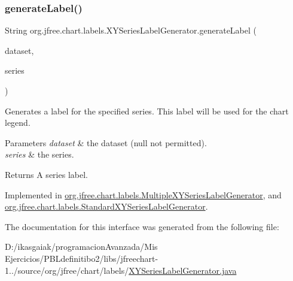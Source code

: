 \subsubsection{\texorpdfstring{generate\+Label()}{generateLabel()}}
{\footnotesize\ttfamily String org.\+jfree.\+chart.\+labels.\+X\+Y\+Series\+Label\+Generator.\+generate\+Label (\begin{DoxyParamCaption}\item[{\mbox{\hyperlink{interfaceorg_1_1jfree_1_1data_1_1xy_1_1_x_y_dataset}{X\+Y\+Dataset}}}]{dataset,  }\item[{int}]{series }\end{DoxyParamCaption})}

Generates a label for the specified series. This label will be used for the chart legend.


\begin{DoxyParams}{Parameters}
{\em dataset} & the dataset ({\ttfamily null} not permitted). \\
\hline
{\em series} & the series.\\
\hline
\end{DoxyParams}
\begin{DoxyReturn}{Returns}
A series label. 
\end{DoxyReturn}


Implemented in \mbox{\hyperlink{classorg_1_1jfree_1_1chart_1_1labels_1_1_multiple_x_y_series_label_generator_a47ff6008d9b39786f639149605081f0f}{org.\+jfree.\+chart.\+labels.\+Multiple\+X\+Y\+Series\+Label\+Generator}}, and \mbox{\hyperlink{classorg_1_1jfree_1_1chart_1_1labels_1_1_standard_x_y_series_label_generator_a375c362db86e54c4d8180f21f18f4ffb}{org.\+jfree.\+chart.\+labels.\+Standard\+X\+Y\+Series\+Label\+Generator}}.



The documentation for this interface was generated from the following file\+:\begin{DoxyCompactItemize}
\item 
D\+:/ikasgaiak/programacion\+Avanzada/\+Mis Ejercicios/\+P\+B\+Ldefinitibo2/libs/jfreechart-\/1../source/org/jfree/chart/labels/\mbox{\hyperlink{_x_y_series_label_generator_8java}{X\+Y\+Series\+Label\+Generator.\+java}}\end{DoxyCompactItemize}
